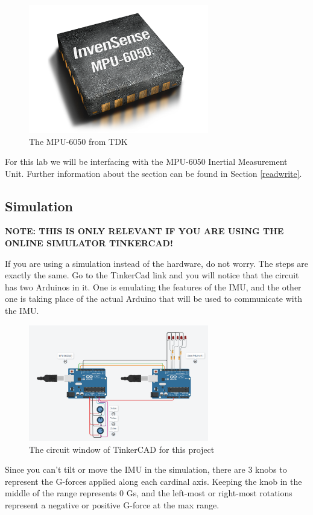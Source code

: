 \documentclass{article}
\begin{document}
        \begin{figure}[ht]
            \centering
            \includegraphics[width = 0.7\textwidth]{img/rp-mpu-6050.png}
            \caption{The MPU-6050 from TDK}
        \end{figure}
        For this lab we will be interfacing with the MPU-6050 Inertial Measurement Unit. Further information about the section can be found in Section \ref{readwrite}. \\
        
        \clearpage
        
    \subsection{Simulation}
    
        \textbf{NOTE: THIS IS ONLY RELEVANT IF YOU ARE USING THE ONLINE SIMULATOR TINKERCAD!} \par 
        
        If you are using a simulation instead of the hardware, do not worry.  The steps are exactly the same.  Go to the TinkerCad link and you will notice that the circuit has two Arduinos in it.  One is emulating the features of the IMU, and the other one is taking place of the actual Arduino that will be used to communicate with the IMU.
        
        \begin{figure}[ht]
            \centering
            \includegraphics[width = 0.7\textwidth]{img/TinkerCadWires.PNG}
            \caption{The circuit window of TinkerCAD for this project}
        \end{figure}
        Since you can't tilt or move the IMU in the simulation, there are 3 knobs to represent the G-forces applied along each cardinal axis. Keeping the knob in the middle of the range represents 0 Gs, and the left-most or right-most rotations represent a negative or positive G-force at the max range. 
        
\end{document}
